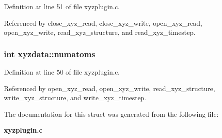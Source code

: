 Definition at line 51 of file xyzplugin.c.

Referenced by close\_\-xyz\_\-read, close\_\-xyz\_\-write, open\_\-xyz\_\-read, open\_\-xyz\_\-write, read\_\-xyz\_\-structure, and read\_\-xyz\_\-timestep.
\subsubsection{\setlength{\rightskip}{0pt plus 5cm}int xyzdata::numatoms}\label{structxyzdata_m1}




Definition at line 50 of file xyzplugin.c.

Referenced by open\_\-xyz\_\-read, open\_\-xyz\_\-write, read\_\-xyz\_\-structure, write\_\-xyz\_\-structure, and write\_\-xyz\_\-timestep.

The documentation for this struct was generated from the following file:\begin{CompactItemize}
\item 
{\bf xyzplugin.c}\end{CompactItemize}

